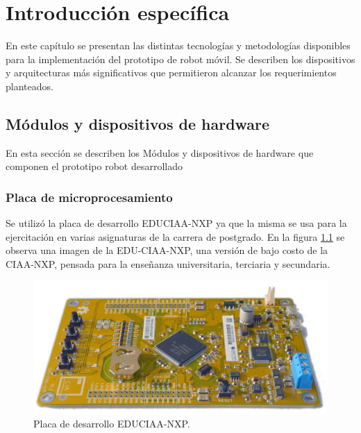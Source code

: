 \chapter{Introducción específica} %

\label{Chapter2}

En este capítulo se presentan las distintas tecnologías y metodologías disponibles para la implementación del prototipo de robot móvil. Se describen los dispositivos y arquitecturas más significativos que permitieron alcanzar los requerimientos planteados.

\section{Módulos y dispositivos de hardware}

En esta sección se describen los Módulos y dispositivos de hardware que componen el prototipo robot desarrollado


\subsection{Placa de microprocesamiento}
Se utilizó  la placa de desarrollo EDUCIAA-NXP \citep{EDUCIAA} ya que la misma se usa para la ejercitación en varias asignaturas de la carrera de postgrado. En la figura \ref{fig:EDUCIAANXP} se observa una imagen de la EDU-CIAA-NXP, una versión de bajo costo de la CIAA-NXP, pensada para la enseñanza universitaria, terciaria y secundaria. 

\begin{figure}[htpb]
	\centering
	\includegraphics[width=\textwidth]{./Figures/EDUCIAANXP.jpg}
	\caption{Placa de desarrollo EDUCIAA-NXP\protect\footnotemark.}
	\label{fig:EDUCIAANXP}
\end{figure}

